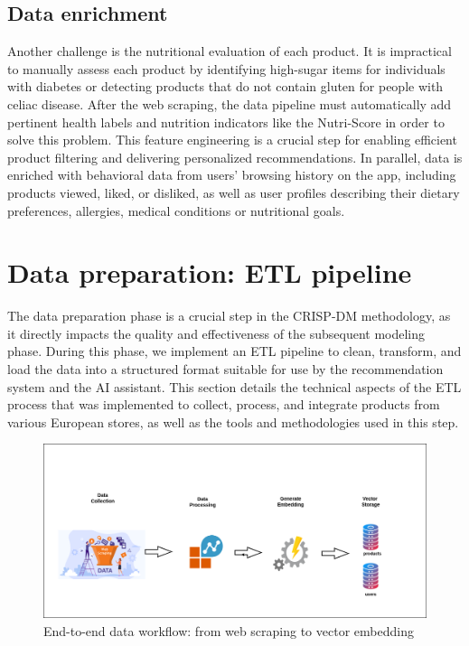 

\subsection{Data enrichment}
Another challenge is the nutritional evaluation of each product. It is
impractical to manually assess each product by identifying high-sugar
items for individuals with diabetes or detecting products that do not
contain gluten for people with celiac disease. After the web scraping, the
data pipeline must automatically add pertinent health labels and nutrition
indicators like the Nutri-Score in order to solve this problem. This feature
engineering is a crucial step for enabling efficient product filtering and
delivering personalized recommendations. In parallel, data is enriched
with behavioral data from users’ browsing history on the app, including
products viewed, liked, or disliked, as well as user profiles describing their
dietary preferences, allergies, medical conditions or nutritional goals.

\section{Data preparation: ETL pipeline}


The data preparation phase is a crucial step in the CRISP-DM methodology, as it directly impacts the quality and effectiveness of the subsequent
modeling phase. During this phase, we implement an ETL pipeline to
clean, transform, and load the data into a structured format suitable for
use by the recommendation system and the AI assistant. This section
details the technical aspects of the ETL process that was implemented
to collect, process, and integrate products from various European stores,
as well as the tools and methodologies used in this step.

\begin{center}
\begin{figure}[H]
    \includegraphics[scale=0.42]{images/workflow__data.png}
    \caption{End-to-end data workflow: from web scraping to vector embedding}
    \label{fig:data_workflow}
\end{figure}
\end{center}

